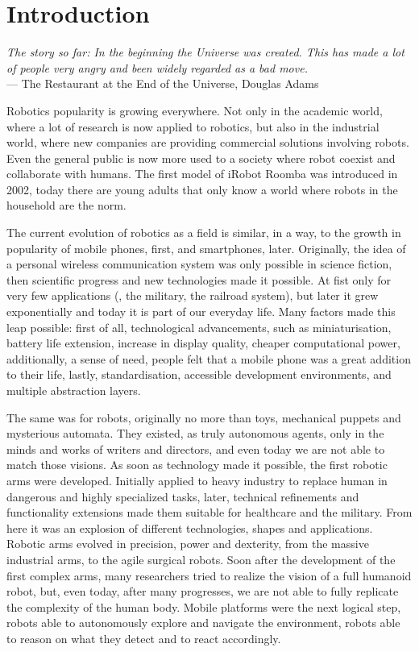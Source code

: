 \chapter{Introduction}\label{ch:introduction}

\begin{flushright}{\slshape The story so far: In the beginning the Universe was created. This has made a lot of people very angry and been widely regarded as a bad move.} \\ \medskip
    ---  The Restaurant at the End of the Universe, Douglas Adams 
\end{flushright}

Robotics popularity is growing everywhere. Not only in the academic world, where a lot of research is now applied to robotics, but also in the industrial world, where new companies are providing commercial solutions involving robots. Even the general public is now more used to a society where robot coexist and collaborate with humans. The first model of iRobot Roomba was introduced in 2002, today there are young adults that only know a world where robots in the household are the norm.

The current evolution of robotics as a field is similar, in a way, to the growth in popularity of mobile phones, first, and smartphones, later.  Originally, the idea of a personal wireless communication system was only possible in science fiction, then scientific progress and new technologies made it possible. At fist only for very few applications (\eg, the military, the railroad system), but later it grew exponentially and today it is part of our everyday life. Many factors made this leap possible: first of all, technological advancements, such as miniaturisation, battery life extension, increase in display quality, cheaper computational power, additionally, a sense of need, people felt that a mobile phone was a great addition to their life, lastly, standardisation, accessible development environments, and multiple abstraction layers.

The same was for robots, originally no more than toys, mechanical puppets and mysterious automata. They existed, as truly autonomous agents, only in the minds and works of writers and directors, and even today we are not able to match those visions. As soon as technology made it possible, the first robotic arms were developed. Initially applied to heavy industry to replace human in dangerous and highly specialized tasks, later, technical refinements and functionality extensions made them suitable for healthcare and the military. From here it was an explosion of different technologies, shapes and applications. Robotic arms evolved in precision, power and dexterity,  from the massive industrial arms, to the agile surgical robots.  Soon after the development of the first complex arms, many researchers tried to realize the vision of a full humanoid robot, but, even today, after many progresses, we are not able to fully replicate the complexity of the human body. Mobile platforms were the next logical step, robots able to autonomously explore and navigate the environment, robots able to reason on what they detect and to react accordingly.

